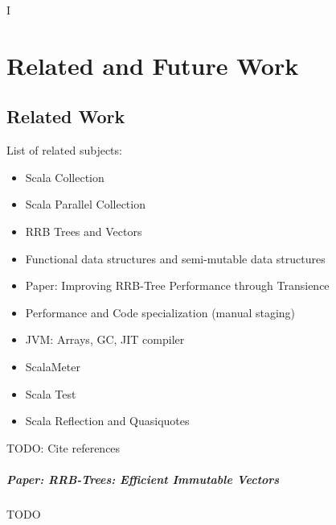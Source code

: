 I%

\chapter{Related and Future Work} %

\label{RelatedWork} %


\section{Related Work}

List of related subjects:
\begin{itemize}
  \item Scala Collection \cite{collect11}
  \item Scala Parallel Collection \cite{Lea:2000:JFF:337449.337465, Prokopec:2014aa}
  \item RRB Trees and Vectors \cite{RRBTrees, lorange2014rrb}
  \item Functional data structures and semi-mutable data structures \cite{DBLP:journals/jfp/HinzeP06, Driscoll:1989:MDS:64313.64317,4637966}
  \item Paper: Improving RRB-Tree Performance through Transience \cite{lorange2014rrb}
  \item Performance and Code specialization (manual staging)
  \item JVM: Arrays, GC, JIT compiler
  \item ScalaMeter
  \item Scala Test
  \item Scala Reflection and Quasiquotes
\end{itemize}

\color{red} TODO: Cite references \color{black}

\paragraph{Paper: \emph{RRB-Trees: Efficient Immutable Vectors}}
\color{red} TODO \color{black}


